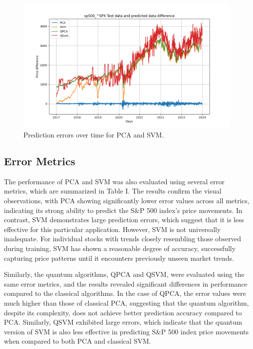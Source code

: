 \documentclass[journal]{IEEEtran}
\begin{document}
\begin{figure}[ht!]
    \centering
    \includegraphics[width=\linewidth]{prediction_error.png}
    \caption{Prediction errors over time for PCA and SVM.}
    \label{fig:error_comparison}
\end{figure}

\subsection{Error Metrics}

The performance of PCA and SVM was also evaluated using several error metrics, which are summarized in Table I. The results confirm the visual observations, with PCA showing significantly lower error values across all metrics, indicating its strong ability to predict the S\&P 500 index’s price movements. In contrast, SVM demonstrates large prediction errors, which suggest that it is less effective for this particular application. However, SVM is not universally inadequate. For individual stocks with trends closely resembling those observed during training, SVM has shown a reasonable degree of accuracy, successfully capturing price patterns until it encounters previously unseen market trends.

Similarly, the quantum algorithms, QPCA and QSVM, were evaluated using the same error metrics, and the results revealed significant differences in performance compared to the classical algorithms. In the case of QPCA, the error values were much higher than those of classical PCA, suggesting that the quantum algorithm, despite its complexity, does not achieve better prediction accuracy compared to PCA. Similarly, QSVM exhibited large errors, which indicate that the quantum version of SVM is also less effective in predicting S\&P 500 index price movements when compared to both PCA and classical SVM.
\end{document}
